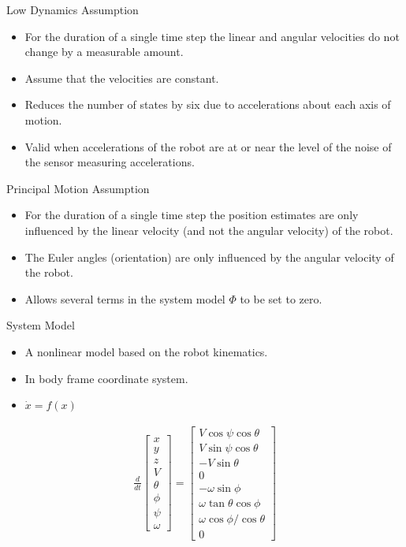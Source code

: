 \documentclass[hyperref={pdfpagelabels=false}]{beamer}
\begin{document}
\begin{frame}{Low Dynamics Assumption}
\begin{itemize}
\item For the duration of a single time step the linear and angular velocities do not change by a measurable amount.
\item Assume that the velocities are constant.
\item Reduces the number of states by six due to accelerations about each axis of motion.
\item Valid when accelerations of the robot are at or near the level of the noise of the sensor measuring accelerations.
\end{itemize}
\end{frame}

\begin{frame}{Principal Motion Assumption}
\begin{itemize}
\item For the duration of a single time step the position estimates are only influenced by the linear velocity (and not the angular velocity) of the robot.
\item The Euler angles (orientation) are only influenced by the angular velocity of the robot.
\item Allows several terms in the system model $\Phi$ to be set to zero.
\end{itemize}
\end{frame}

\begin{frame}{System Model}
\begin{itemize}
\item A nonlinear model based on the robot kinematics.
\item In body frame coordinate system.
\item $\dot{x} = f(x)$
\end{itemize}
\begin{align*}
\frac{d}{dt}\left[\begin{array}{c}
x \\ y \\ z \\ V \\ \theta \\ \phi \\ \psi \\ \omega
\end{array}\right] =
\left[\begin{array}{c}
V\cos\psi\cos\theta \\
V\sin\psi\cos\theta \\
-V\sin\theta \\
0 \\
-\omega\sin\phi \\
\omega\tan\theta\cos\phi \\
\omega\cos\phi/\cos\theta \\
0
\end{array}\right]
\end{align*}
\end{frame}
\end{document}

